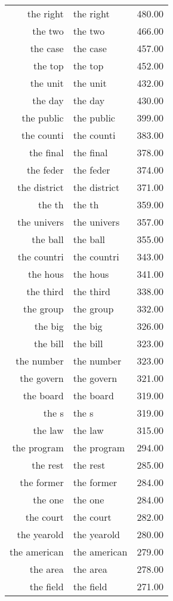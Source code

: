 \begin{table}[ht]
\begin{tabular}{rlr}
  the right & the right & 480.00 \\ 
  the two & the two & 466.00 \\ 
  the case & the case & 457.00 \\ 
  the top & the top & 452.00 \\ 
  the unit & the unit & 432.00 \\ 
  the day & the day & 430.00 \\ 
  the public & the public & 399.00 \\ 
  the counti & the counti & 383.00 \\ 
  the final & the final & 378.00 \\ 
  the feder & the feder & 374.00 \\ 
  the district & the district & 371.00 \\ 
  the th & the th & 359.00 \\ 
  the univers & the univers & 357.00 \\ 
  the ball & the ball & 355.00 \\ 
  the countri & the countri & 343.00 \\ 
  the hous & the hous & 341.00 \\ 
  the third & the third & 338.00 \\ 
  the group & the group & 332.00 \\ 
  the big & the big & 326.00 \\ 
  the bill & the bill & 323.00 \\ 
  the number & the number & 323.00 \\ 
  the govern & the govern & 321.00 \\ 
  the board & the board & 319.00 \\ 
  the s & the s & 319.00 \\ 
  the law & the law & 315.00 \\ 
  the program & the program & 294.00 \\ 
  the rest & the rest & 285.00 \\ 
  the former & the former & 284.00 \\ 
  the one & the one & 284.00 \\ 
  the court & the court & 282.00 \\ 
  the yearold & the yearold & 280.00 \\ 
  the american & the american & 279.00 \\ 
  the area & the area & 278.00 \\ 
  the field & the field & 271.00 \\ 

\end{tabular}
\end{table}
